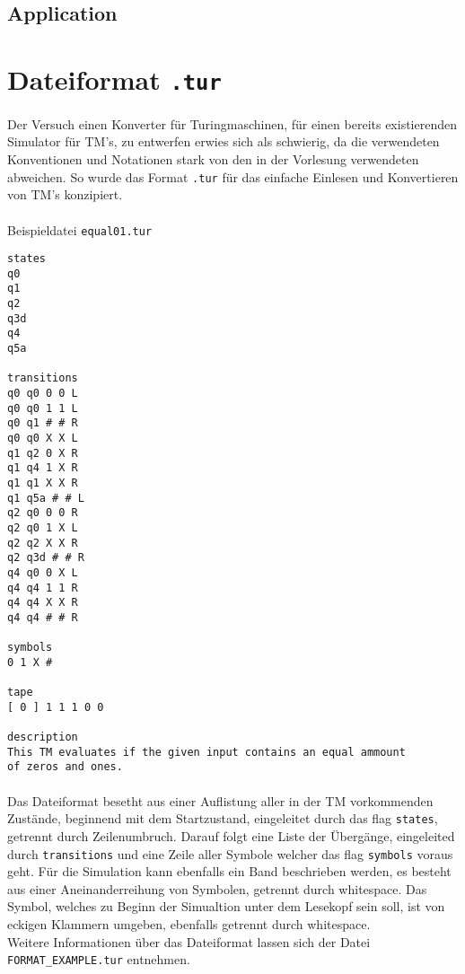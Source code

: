 \documentclass[10pt, a4paper]{article}
\newcommand{\ilc}{\texttt}
\begin{document}
\subsection*{Application}


\section*{Dateiformat \ilc{.tur}}
\paragraph*{}
Der Versuch einen Konverter für Turingmaschinen, für einen bereits existierenden Simulator für TM's, zu entwerfen erwies sich als schwierig, da die verwendeten Konventionen und Notationen stark von den in der Vorlesung verwendeten abweichen. So wurde das Format \ilc{.tur} für das einfache Einlesen und Konvertieren von TM's konzipiert.\par

\paragraph*{}
\begin{center}
Beispieldatei \texttt{equal01.tur}
\end{center}
\begin{tiny}
\begin{tcolorbox}
\begin{verbatim}
states
q0
q1
q2
q3d
q4
q5a

transitions
q0 q0 0 0 L
q0 q0 1 1 L
q0 q1 # # R
q0 q0 X X L
q1 q2 0 X R
q1 q4 1 X R
q1 q1 X X R
q1 q5a # # L
q2 q0 0 0 R
q2 q0 1 X L
q2 q2 X X R
q2 q3d # # R
q4 q0 0 X L
q4 q4 1 1 R
q4 q4 X X R
q4 q4 # # R

symbols
0 1 X #

tape
[ 0 ] 1 1 1 0 0

description
This TM evaluates if the given input contains an equal ammount
of zeros and ones. 
\end{verbatim}
\end{tcolorbox}
\end{tiny}
\par

\paragraph*{}
Das Dateiformat besetht aus einer Auflistung aller in der TM vorkommenden Zustände, beginnend mit dem Startzustand, eingeleitet durch das flag \ilc{states}, getrennt durch Zeilenumbruch. Darauf folgt eine Liste der Übergänge, eingeleited durch \ilc{transitions} und eine Zeile aller Symbole welcher das flag \ilc{symbols} voraus geht. Für die Simulation kann ebenfalls ein Band beschrieben werden, es besteht aus einer Aneinanderreihung von Symbolen, getrennt durch whitespace. Das Symbol, welches zu Beginn der Simualtion unter dem Lesekopf sein soll, ist von eckigen Klammern umgeben, ebenfalls getrennt durch whitespace.\\
Weitere Informationen über das Dateiformat lassen sich der Datei \ilc{FORMAT\_EXAMPLE.tur} entnehmen.\par
\end{document}
